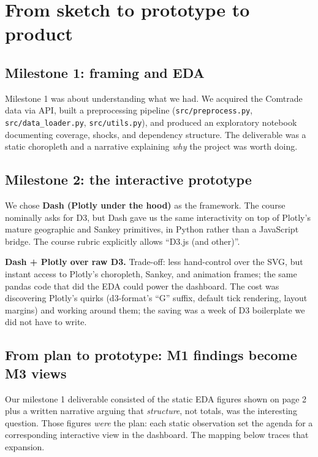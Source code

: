 \documentclass[a4paper,10pt]{article}
\begin{document}
\newpage

\section{From sketch to prototype to product}

\subsection{Milestone 1: framing and EDA}

Milestone 1 was about understanding what we had. We acquired the Comtrade data
via API, built a preprocessing pipeline (\texttt{src/preprocess.py},
\texttt{src/data\_loader.py}, \texttt{src/utils.py}), and produced an
exploratory notebook documenting coverage, shocks, and dependency structure.
The deliverable was a static choropleth and a narrative explaining \emph{why}
the project was worth doing.

\subsection{Milestone 2: the interactive prototype}

We chose \textbf{Dash (Plotly under the hood)} as the framework. The course
nominally asks for D3, but Dash gave us the same interactivity on top of
Plotly's mature geographic and Sankey primitives, in Python rather than a
JavaScript bridge. The course rubric explicitly allows ``D3.js (and other)''.

\begin{decision}
\textbf{Dash + Plotly over raw D3.}
Trade-off: less hand-control over the SVG, but instant access to Plotly's
choropleth, Sankey, and animation frames; the same pandas code that did the
EDA could power the dashboard. The cost was discovering Plotly's quirks
(d3-format's ``G'' suffix, default tick rendering, layout margins) and
working around them; the saving was a week of D3 boilerplate we did not
have to write.
\end{decision}

\subsection{From plan to prototype: M1 findings become M3 views}

Our milestone 1 deliverable consisted of the static EDA figures shown on
page 2 plus a written narrative arguing that \emph{structure}, not totals,
was the interesting question. Those figures \emph{were} the plan: each
static observation set the agenda for a corresponding interactive view in
the dashboard. The mapping below traces that expansion.
\end{document}
